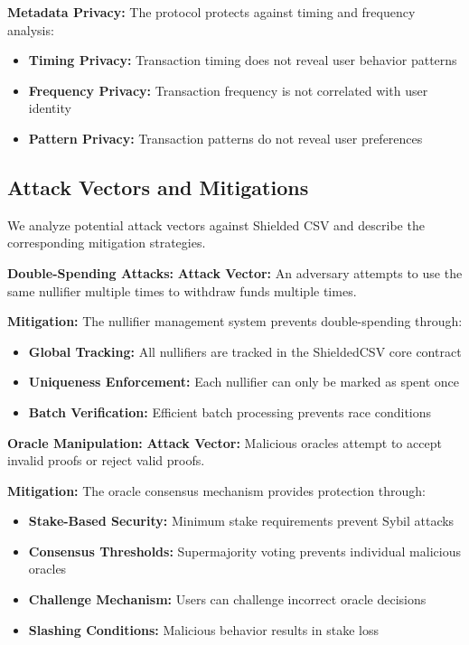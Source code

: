 \documentclass[11pt,a4paper]{article}
\begin{document}
\textbf{Metadata Privacy:}
The protocol protects against timing and frequency analysis:

\begin{itemize}
    \item \textbf{Timing Privacy:} Transaction timing does not reveal user behavior patterns
    \item \textbf{Frequency Privacy:} Transaction frequency is not correlated with user identity
    \item \textbf{Pattern Privacy:} Transaction patterns do not reveal user preferences
\end{itemize}

\subsection{Attack Vectors and Mitigations}

We analyze potential attack vectors against Shielded CSV and describe the corresponding mitigation strategies.

\textbf{Double-Spending Attacks:}
\textbf{Attack Vector:} An adversary attempts to use the same nullifier multiple times to withdraw funds multiple times.

\textbf{Mitigation:} The nullifier management system prevents double-spending through:
\begin{itemize}
    \item \textbf{Global Tracking:} All nullifiers are tracked in the ShieldedCSV core contract
    \item \textbf{Uniqueness Enforcement:} Each nullifier can only be marked as spent once
    \item \textbf{Batch Verification:} Efficient batch processing prevents race conditions
\end{itemize}

\textbf{Oracle Manipulation:}
\textbf{Attack Vector:} Malicious oracles attempt to accept invalid proofs or reject valid proofs.

\textbf{Mitigation:} The oracle consensus mechanism provides protection through:
\begin{itemize}
    \item \textbf{Stake-Based Security:} Minimum stake requirements prevent Sybil attacks
    \item \textbf{Consensus Thresholds:} Supermajority voting prevents individual malicious oracles
    \item \textbf{Challenge Mechanism:} Users can challenge incorrect oracle decisions
    \item \textbf{Slashing Conditions:} Malicious behavior results in stake loss
\end{itemize}
\end{document}
